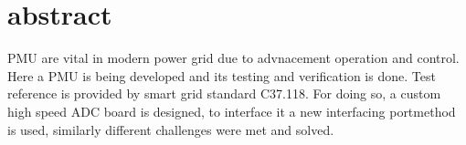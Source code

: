 \section{abstract}
PMU are vital in modern power grid due to advnacement operation and control. Here a PMU is being developed and its testing and verification is done. Test reference is provided by smart grid standard C37.118. For doing so, a custom high speed ADC board is designed, to interface it a new interfacing portmethod is used, similarly different challenges were met and solved.